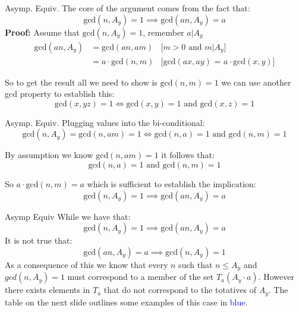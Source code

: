 \documentclass{beamer}
\begin{document}
\begin{frame}{Asymp. Equiv.}
The core of the argument comes from the fact that: $$\text{gcd}(n, A_y) = 1 \implies \text{gcd}(an, A_y) = a  $$
\textbf{Proof:}\linebreak  
Assume that $\text{gcd}(n, A_y) = 1$, remember $a|A_y$ \begin{align*}
    \text{gcd}(an, A_y) &=  \text{gcd}(an, am) & \text{[$m>0$ and $m|A_y$]}\\
    &= a \cdot  \text{gcd}(n, m) & \text{[gcd$(ax,ay)$ = $a \cdot \text{gcd}(x,y)$]}
\end{align*}

So to get the result all we need to show is $\text{gcd}(n, m) = 1$ we can use another gcd property to establish this: $$\text{gcd}(x, yz) = 1 \iff \text{gcd}(x, y) = 1 \text{ and } \text{gcd}(x, z) = 1$$
    
\end{frame}

\begin{frame}{Asymp. Equiv.}
Plugging values into the bi-conditional:
$$\text{gcd}(n, A_y) = \text{gcd}(n, am) = 1 \iff \text{gcd}(n, a) = 1 \text{ and } \text{gcd}(n, m) = 1$$

By assumption we know $\text{gcd}(n, am) = 1$ it follows that: $$\text{gcd}(n, a) = 1 \text{ and } \text{gcd}(n, m) = 1$$ 

So $a \cdot  \text{gcd}(n, m) = a$ which is sufficient to establish the implication:
$$\text{gcd}(n, A_y) = 1 \implies \text{gcd}(an, A_y) = a$$
\end{frame}

\begin{frame}{Asymp Equiv}
    While we have that: $$\text{gcd}(n, A_y) = 1 \implies \text{gcd}(an, A_y) = a$$
    It is not true that: $$ \text{gcd}(an, A_y) = a  \implies \text{gcd}(n, A_y) = 1$$
    As a consequence of this we know that every $n$ such that $n \leq A_y$ and $gcd(n, A_y) = 1$ must correspond to a member of the set $T_a(A_y \cdot a)$. \linebreak \linebreak  However there exists elements in $T_a$ that do not correspond to the totatives of $A_y$. The table on the next slide outlines some examples of this case in \textcolor{blue}{blue}.
\end{frame}
\end{document}
